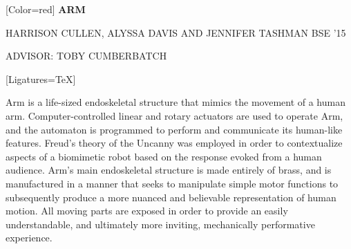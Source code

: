 \documentclass{article}
\begin{document}
{
	[Color=red]
	\fontsize{0.8in}{0.4in}\selectfont 
	\bfseries
	ARM
}

\vspace{0.25in}

{
	\fontsize{0.494in}{0.6in}\selectfont
	HARRISON CULLEN, ALYSSA DAVIS {\fontsize{0.4in}{0.6in}\selectfont AND}
	 JENNIFER TASHMAN {\fontsize{0.4in}{0.6in}\selectfont BSE '15}
}

\vspace{0.1in}

{
	\fontsize{0.4in}{0.4in}\selectfont
	ADVISOR: TOBY CUMBERBATCH
}

\vspace{0.2in}

{
	[Ligatures=TeX]
	\fontsize{0.4in}{0.46in}\selectfont

    Arm is a life-sized endoskeletal structure that mimics the movement of a
	human arm. Computer-controlled linear and rotary actuators are used to operate
	Arm, and the automaton is programmed to perform and communicate its human-like
	features. Freud’s theory of the Uncanny was employed in order to contextualize
	aspects of a biomimetic robot based on the response evoked from a human
	audience. Arm’s main endoskeletal structure is made entirely of brass, and is
	manufactured in a manner that seeks to manipulate simple motor functions to
	subsequently produce a more nuanced and believable representation of human
	motion. All moving parts are exposed in order to provide an easily
	understandable, and ultimately more inviting, mechanically performative
	experience.

}
\end{document}
